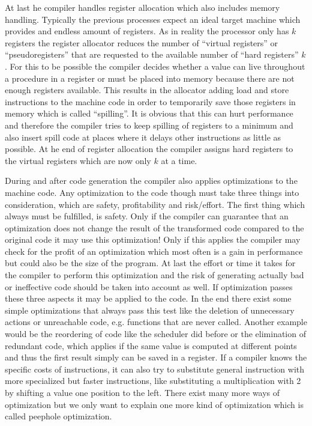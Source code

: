 At last he compiler handles register allocation which also includes memory handling.
Typically the previous processes expect an ideal target machine which provides and endless amount of registers.
As in reality the processor only has $k$ registers the register allocator reduces the number of ``virtual registers'' or ``pseudoregisters'' that are requested to the available number of ``hard registers'' $k$.
For this to be possible the compiler decides whether a value can live throughout a procedure in a register or must be placed into memory because there are not enough registers available.
This results in the allocator adding load and store instructions to the machine code in order to temporarily save those registers in memory which is called ``spilling''.
It is obvious that this can hurt performance and therefore the compiler tries to keep spilling of registers to a minimum and also insert spill code at places where it delays other instructions as little as possible.
At he end of register allocation the compiler assigns hard registers to the virtual registers which are now only $k$ at a time.

During and after code generation the compiler also applies optimizations to the machine code.
Any optimization to the code though must take three things into consideration, which are safety, profitability and risk/effort.
The first thing which always must be fulfilled, is safety.
Only if the compiler can guarantee that an optimization does not change the result of the transformed code compared to the original code it may use this optimization!
Only if this applies the compiler may check for the profit of an optimization which most often is a gain in performance but could also be the size of the program.
At last the effort or time it takes for the compiler to perform this optimization and the risk of generating actually bad or ineffective code should be taken into account as well.
If optimization passes these three aspects it may be applied to the code.
In the end there exist some simple optimizations that always pass this test like the deletion of unnecessary actions or unreachable code, e.g. functions that are never called.
Another example would be the reordering of code like the scheduler did before or the elimination of redundant code, which applies if the same value is computed at different points and thus the first result simply can be saved in a register.
If a compiler knows the specific costs of instructions, it can also try to substitute general instruction with more specialized but faster instructions, like substituting a multiplication with 2 by shifting a value one position to the left.
There exist many more ways of optimization but we only want to explain one more kind of optimization which is called peephole optimization.


